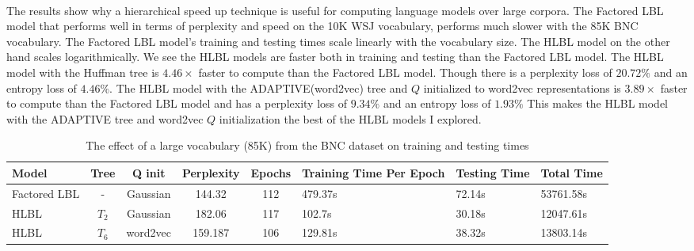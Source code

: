 \paragraph{}
The results show why a hierarchical speed up technique is useful for computing language models over large corpora. The Factored LBL model that performs well in terms of perplexity and speed on the 10K WSJ vocabulary, performs much slower with the 85K BNC vocabulary. The Factored LBL model's training and testing times scale linearly with the vocabulary size. The HLBL model on the other hand scales logarithmically.  We see the HLBL models are faster both in training and testing than the Factored LBL model. The HLBL model with the Huffman tree is $4.46\times$ faster to compute than the Factored LBL model. Though there is a perplexity loss of $20.72\%$ and an entropy loss of $4.46\%$. The HLBL model with the ADAPTIVE(word2vec) tree and $Q$ initialized to word2vec representations is $3.89\times$ faster to compute than the Factored LBL model and has a perplexity loss of $9.34\%$ and an entropy loss of $1.93\%$ This makes the HLBL model with the ADAPTIVE tree and word2vec $Q$ initialization the best of the HLBL models I explored.


\begin{table*} \centering
{}
\begin{tabular}{@{}C{2cm}ccccC{2cm}C{2cm}C{2cm}@{}}\toprule
Model & Tree & Q init & Perplexity & Epochs & Training Time Per Epoch & Testing Time & Total Time\\ 
\midrule
 Factored LBL & - & Gaussian &144.32& 112 & 479.37s & 72.14s & 53761.58s\\
 HLBL& $T_2$ & Gaussian &182.06& 117& 102.7s &30.18s &12047.61s \\
 HLBL & $T_6$ & word2vec &159.187& 106& 129.81s &38.32s &13803.14s \\
\bottomrule
\end{tabular}
\caption{The effect of a large vocabulary (85K) from the BNC dataset on training and testing times}
\label{tab:largeVocabulary}
\end{table*}
  
  
  
